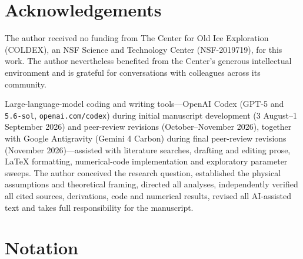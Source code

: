 \documentclass[review]{igs}
\begin{document}
\section*{Acknowledgements}
The author received no funding from The Center for Old Ice Exploration (COLDEX), an NSF Science and Technology Center (NSF-2019719), for this work. The author nevertheless benefited from the Center's generous intellectual environment and is grateful for conversations with colleagues across its community.

Large-language-model coding and writing tools---OpenAI Codex (GPT-5 and \texttt{5.6-sol}, \texttt{openai.com/codex}) during initial manuscript development (3 August--1 September 2026) and peer-review revisions (October--November 2026), together with Google Antigravity (Gemini 4 Carbon) during final peer-review revisions (November 2026)---assisted with literature searches, drafting and editing prose, LaTeX formatting, numerical-code implementation and exploratory parameter sweeps. The author conceived the research question, established the physical assumptions and theoretical framing, directed all analyses, independently verified all cited sources, derivations, code and numerical results, revised all AI-assisted text and takes full responsibility for the manuscript.




\setcounter{secnumdepth}{1}
\appendix
\makeatletter
{}
\makeatother

\section{Notation}
\label{app:notation}
\end{document}
